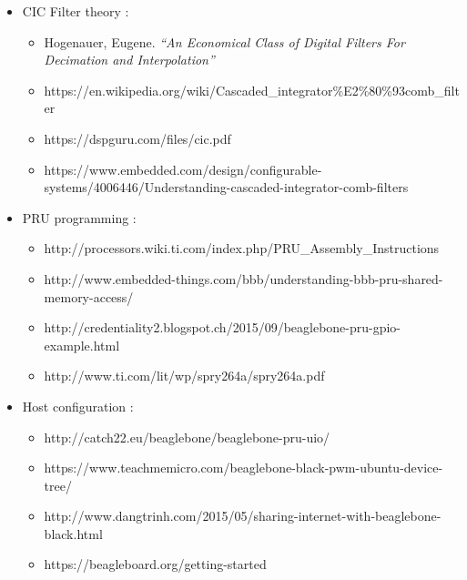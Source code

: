 \documentclass[]{report}
\providecommand{\tightlist}{%
	\setlength{\itemsep}{0pt}\setlength{\parskip}{0pt}}
\begin{document}
\begin{itemize}
\tightlist
\item
  CIC Filter theory :

  \begin{itemize}
  \tightlist
  \item
    Hogenauer, Eugene. \emph{``An Economical Class of Digital Filters
    For Decimation and Interpolation''}
  \item
    https://en.wikipedia.org/wiki/Cascaded\_integrator\%E2\%80\%93comb\_filter
  \item
    https://dspguru.com/files/cic.pdf
  \item
    https://www.embedded.com/design/configurable-systems/4006446/Understanding-cascaded-integrator-comb-filters
  \end{itemize}
\item
  PRU programming :

  \begin{itemize}
  \tightlist
  \item
    http://processors.wiki.ti.com/index.php/PRU\_Assembly\_Instructions
  \item
    http://www.embedded-things.com/bbb/understanding-bbb-pru-shared-memory-access/
  \item
    http://credentiality2.blogspot.ch/2015/09/beaglebone-pru-gpio-example.html
  \item
    http://www.ti.com/lit/wp/spry264a/spry264a.pdf
  \end{itemize}
\item
  Host configuration :

  \begin{itemize}
  \tightlist
  \item
    http://catch22.eu/beaglebone/beaglebone-pru-uio/
  \item
    https://www.teachmemicro.com/beaglebone-black-pwm-ubuntu-device-tree/
  \item
    http://www.dangtrinh.com/2015/05/sharing-internet-with-beaglebone-black.html
  \item
    https://beagleboard.org/getting-started
  \end{itemize}
\end{itemize}
\end{document}
